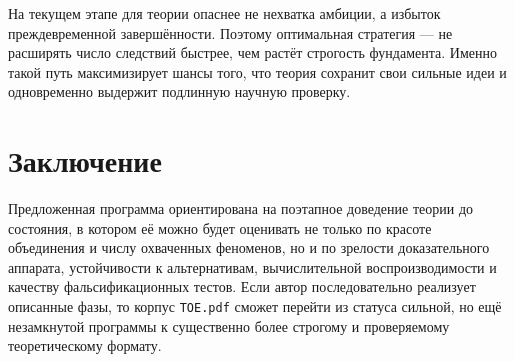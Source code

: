 \documentclass[12pt,a4paper]{article}
\begin{document}
На текущем этапе для теории опаснее не нехватка амбиции, а избыток преждевременной завершённости. Поэтому оптимальная стратегия --- не расширять число следствий быстрее, чем растёт строгость фундамента. Именно такой путь максимизирует шансы того, что теория сохранит свои сильные идеи и одновременно выдержит подлинную научную проверку.

\section{Заключение}

Предложенная программа ориентирована на поэтапное доведение теории до состояния, в котором её можно будет оценивать не только по красоте объединения и числу охваченных феноменов, но и по зрелости доказательного аппарата, устойчивости к альтернативам, вычислительной воспроизводимости и качеству фальсификационных тестов. Если автор последовательно реализует описанные фазы, то корпус \texttt{TOE.pdf} сможет перейти из статуса сильной, но ещё незамкнутой программы к существенно более строгому и проверяемому теоретическому формату.
\end{document}
